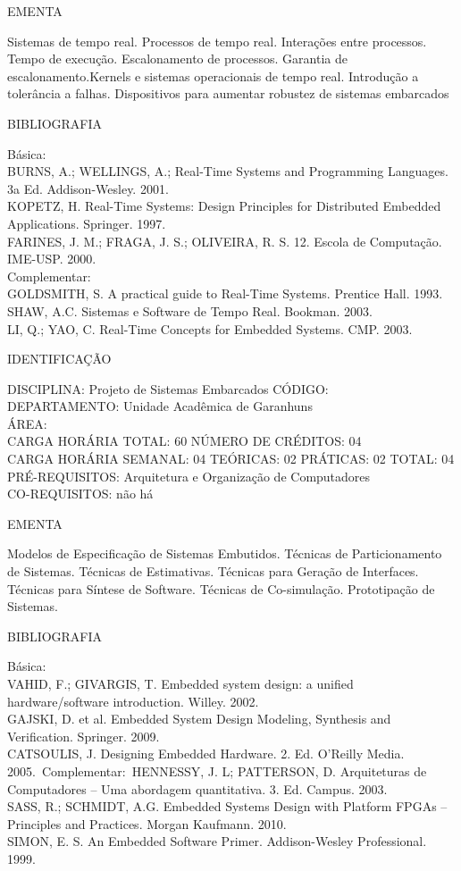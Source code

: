 \documentclass[
	12pt,				%
	openright,			%
  oneside,     %
	a4paper,			%
	english,			%
	french,				%
	spanish,			%
	brazil				%
	]{abntex2}
\begin{document}
\begin{apendicesenv}
EMENTA 

Sistemas de tempo real. Processos de tempo real. Interações entre
processos. Tempo de execução. Escalonamento de processos. Garantia de
escalonamento.Kernels e sistemas operacionais de tempo real. Introdução a tolerância a
falhas. Dispositivos para aumentar robustez de sistemas embarcados

BIBLIOGRAFIA 

Básica:\\
BURNS, A.; WELLINGS, A.; Real-Time Systems and Programming Languages. 3a
Ed. Addison-Wesley. 2001.\\
KOPETZ, H. Real-Time Systems: Design Principles for Distributed Embedded
Applications. Springer. 1997.\\
FARINES, J. M.; FRAGA, J. S.; OLIVEIRA, R. S. 12. Escola de Computação.
IME-USP. 2000.\\
Complementar:\\
GOLDSMITH, S. A practical guide to Real-Time Systems. Prentice Hall.
1993.\\
SHAW, A.C. Sistemas e Software de Tempo Real. Bookman. 2003.\\
LI, Q.; YAO, C. Real-Time Concepts for Embedded Systems. CMP. 2003.

\newpage IDENTIFICAÇÃO

DISCIPLINA: Projeto de Sistemas Embarcados CÓDIGO:\\ 
DEPARTAMENTO: Unidade Acadêmica de Garanhuns\\
ÁREA: \\
CARGA HORÁRIA TOTAL: 60 NÚMERO DE CRÉDITOS: 04\\
CARGA HORÁRIA SEMANAL: 04 TEÓRICAS: 02 PRÁTICAS: 02 TOTAL: 04\\
PRÉ-REQUISITOS: Arquitetura e Organização de Computadores\\
CO-REQUISITOS: não há

EMENTA 

Modelos de Especificação de Sistemas Embutidos. Técnicas de
Particionamento de Sistemas. Técnicas de Estimativas. Técnicas para
Geração de Interfaces. Técnicas para Síntese de Software. Técnicas de
Co-simulação. Prototipação de Sistemas.

BIBLIOGRAFIA 

Básica:\\
VAHID, F.; GIVARGIS, T. Embedded system design: a unified
hardware/software introduction. Willey. 2002.\\
GAJSKI, D. et al. Embedded System Design  Modeling, Synthesis and
Verification. Springer. 2009.\\
CATSOULIS, J. Designing Embedded Hardware. 2. Ed.
O'Reilly Media. 2005.\
Complementar:\
HENNESSY, J. L; PATTERSON, D. Arquiteturas de Computadores -- Uma
abordagem quantitativa. 3. Ed. Campus. 2003.\\
SASS, R.; SCHMIDT, A.G. Embedded Systems Design with Platform FPGAs --
Principles and Practices. Morgan Kaufmann. 2010.\\
SIMON, E. S. An Embedded Software Primer. Addison-Wesley Professional.
1999.


\end{apendicesenv}
\end{document}
